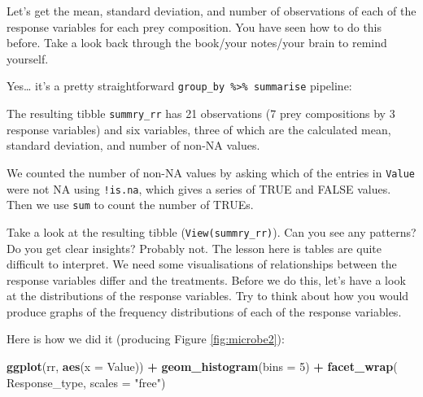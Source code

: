 \documentclass[]{book}
\makeatletter
\newenvironment{Shaded}{\begin{snugshade}}{\end{snugshade}}
\newcommand{\DataTypeTok}[1]{\textcolor[rgb]{0.13,0.29,0.53}{#1}}
\newcommand{\DecValTok}[1]{\textcolor[rgb]{0.00,0.00,0.81}{#1}}
\newcommand{\KeywordTok}[1]{\textcolor[rgb]{0.13,0.29,0.53}{\textbf{#1}}}
\newcommand{\NormalTok}[1]{#1}
\newcommand{\OperatorTok}[1]{\textcolor[rgb]{0.81,0.36,0.00}{\textbf{#1}}}
\newcommand{\OtherTok}[1]{\textcolor[rgb]{0.56,0.35,0.01}{#1}}
\newcommand{\StringTok}[1]{\textcolor[rgb]{0.31,0.60,0.02}{#1}}
\newenvironment{kframe}{%
\medskip{}
\setlength{\fboxsep}{.8em}
 \def\at@end@of@kframe{}%
 \ifinner\ifhmode%
  \def\at@end@of@kframe{\end{minipage}}%
  \begin{minipage}{\columnwidth}%
 \fi\fi%
 \def\FrameCommand##1{\hskip\@totalleftmargin \hskip-\fboxsep
 \colorbox{shadecolor}{##1}\hskip-\fboxsep
     \hskip-\linewidth \hskip-\@totalleftmargin \hskip\columnwidth}%
 \MakeFramed {\advance\hsize-\width
   \@totalleftmargin\z@ \linewidth\hsize
   \@setminipage}}%
 {\par\unskip\endMakeFramed%
 \at@end@of@kframe}
\newenvironment{rmdblock}[1]
  {
  \begin{itemize}
  \renewcommand{\labelitemi}{
    \raisebox{-.7\height}[0pt][0pt]{
      {\setkeys{Gin}{width=3em,keepaspectratio}\texttt{[image: images/\#1]}}
    }
  }
  \setlength{\fboxsep}{1em}
  \begin{kframe}
  \item
  }
  {
  \end{kframe}
  \end{itemize}
  }
\newenvironment{info}
  {\begin{rmdblock}{info}}
  {\end{rmdblock}}
\makeatother
\begin{document}
Let's get the mean, standard deviation, and number of observations of each of the response variables for each prey composition. You have seen how to do this before. Take a look back through the book/your notes/your brain to remind yourself.

Yes\ldots{} it's a pretty straightforward \texttt{group\_by\ \%\textgreater{}\%\ summarise} pipeline:

\begin{Shaded}
\end{Shaded}

The resulting tibble \texttt{summry\_rr} has 21 observations (7 prey compositions by 3 response variables) and six variables, three of which are the calculated mean, standard deviation, and number of non-NA values.

\begin{info}
We counted the number of non-NA values by asking which of the entries in
\texttt{Value} were not NA using \texttt{!is.na}, which gives a series
of TRUE and FALSE values. Then we use \texttt{sum} to count the number
of TRUEs.
\end{info}

Take a look at the resulting tibble (\texttt{View(summry\_rr)}). Can you see any patterns? Do you get clear insights? Probably not. The lesson here is tables are quite difficult to interpret. We need some visualisations of relationships between the response variables differ and the treatments. Before we do this, let's have a look at the distributions of the response variables. Try to think about how you would produce graphs of the frequency distributions of each of the response variables.

Here is how we did it (producing Figure \ref{fig:microbe2}):

\begin{Shaded}
\begin{Highlighting}[]
\KeywordTok{ggplot}\NormalTok{(rr, }\KeywordTok{aes}\NormalTok{(}\DataTypeTok{x =}\NormalTok{ Value)) }\OperatorTok{+}
\StringTok{  }\KeywordTok{geom_histogram}\NormalTok{(}\DataTypeTok{bins =} \DecValTok{5}\NormalTok{) }\OperatorTok{+}
\StringTok{  }\KeywordTok{facet_wrap}\NormalTok{(}\OperatorTok{~}\StringTok{ }\NormalTok{Response_type, }\DataTypeTok{scales =} \StringTok{"free"}\NormalTok{)}
\end{Highlighting}
\end{Shaded}
\end{document}
